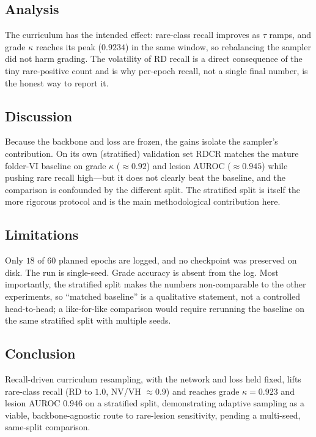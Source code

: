 \documentclass[journal,twoside,web]{ieeecolor}
\begin{document}
\subsection{Analysis}
The curriculum has the intended effect: rare-class recall improves as $\tau$ ramps,
and grade $\kappa$ reaches its peak ($0.9234$) in the same window, so rebalancing
the sampler did not harm grading. The volatility of RD recall is a direct
consequence of the tiny rare-positive count and is why per-epoch recall, not a
single final number, is the honest way to report it.

\subsection{Discussion}
Because the backbone and loss are frozen, the gains isolate the sampler's
contribution. On its own (stratified) validation set RDCR matches the mature
folder-VI baseline on grade $\kappa$ ($\approx0.92$) and lesion AUROC
($\approx0.945$) while pushing rare recall high---but it does not clearly beat the
baseline, and the comparison is confounded by the different split. The stratified
split is itself the more rigorous protocol and is the main methodological
contribution here.

\subsection{Limitations}
Only $18$ of $60$ planned epochs are logged, and no checkpoint was preserved on
disk. The run is single-seed. Grade accuracy is absent from the log. Most
importantly, the stratified split makes the numbers non-comparable to the other
experiments, so ``matched baseline'' is a qualitative statement, not a controlled
head-to-head; a like-for-like comparison would require rerunning the baseline on the
same stratified split with multiple seeds.

\subsection{Conclusion}
Recall-driven curriculum resampling, with the network and loss held fixed, lifts
rare-class recall (RD to $1.0$, NV/VH $\approx0.9$) and reaches grade $\kappa=0.923$
and lesion AUROC $0.946$ on a stratified split, demonstrating adaptive sampling as a
viable, backbone-agnostic route to rare-lesion sensitivity, pending a multi-seed,
same-split comparison.

\end{document}
